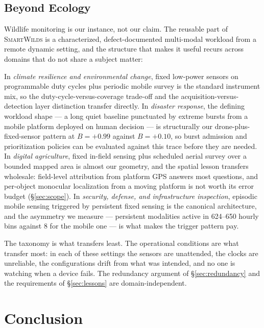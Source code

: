 \documentclass[sigconf]{acmart}
\newcommand{\smartwilds}{\textsc{SmartWilds}\xspace}
\begin{document}
\subsection{Beyond Ecology}
\label{sec:beyond}

Wildlife monitoring is our instance, not our claim. The reusable part of
\smartwilds is a characterized, defect-documented multi-modal workload
from a remote dynamic setting, and the structure that makes it useful
recurs across domains that do not share a subject matter:

In \emph{climate resilience and environmental change}, fixed low-power
sensors on programmable duty cycles plus periodic mobile survey is the
standard instrument mix, so the duty-cycle-versus-coverage trade-off and
the acquisition-versus-detection layer distinction transfer directly.
In \emph{disaster response}, the defining workload shape --- a long
quiet baseline punctuated by extreme bursts from a mobile platform
deployed on human decision --- is structurally our drone-plus-fixed-sensor
pattern at $B{=}+0.99$ against $B{=}+0.10$, so burst admission and
prioritization policies can be evaluated against this trace before they
are needed. In \emph{digital agriculture}, fixed in-field sensing plus
scheduled aerial survey over a bounded mapped area is almost our
geometry, and the spatial lesson transfers wholesale: field-level
attribution from platform GPS answers most questions, and per-object
monocular localization from a moving platform is not worth its error
budget (\S\ref{sec:scope}). In \emph{security, defense, and
infrastructure inspection}, episodic mobile sensing triggered by
persistent fixed sensing is the canonical architecture, and the
asymmetry we measure --- persistent modalities active in 624--650 hourly bins
against 8 for the mobile one --- is what makes the trigger pattern pay.

The taxonomy is what transfers least. The operational conditions are
what transfer most: in each of these settings the sensors are
unattended, the clocks are unreliable, the configurations drift from
what was intended, and no one is watching when a device fails. The
redundancy argument of \S\ref{sec:redundancy} and the requirements of
\S\ref{sec:lessons} are domain-independent.

\section{Conclusion}
\label{sec:conclusion}
\end{document}
